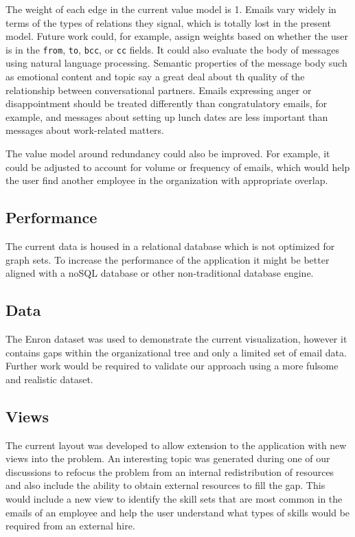 \documentclass[journal]{vgtc}                %
\begin{document}
The weight of each edge in the current value model is 1. Emails vary widely in terms of the types of relations they signal, which is totally lost in the present model. Future work could, for example, assign weights based on whether the user is in the \texttt{from}, \texttt{to}, \texttt{bcc}, or \texttt{cc} fields.  It could also evaluate the body of messages using natural language processing. Semantic properties of the message body such as emotional content and topic say a great deal about th quality of the relationship between conversational partners. Emails expressing anger or disappointment should be treated differently than congratulatory emails, for example, and messages about setting up lunch dates are less important than messages about work-related matters. 

The value model around redundancy could also be improved. For example, it could be adjusted to account for volume or frequency of emails, which would help the user find another employee in the organization with appropriate overlap.

\subsection{Performance}

The current data is housed in a relational database which is not optimized for graph sets.  To increase the performance of the application it might be better aligned with a noSQL database or other non-traditional database engine.

\subsection{Data}

The Enron dataset was used to demonstrate the current visualization, however it contains gaps within the organizational tree and only a limited set of email data.  Further work would be required to validate our approach using a more fulsome and realistic dataset.

\subsection{Views}

The current layout was developed to allow extension to the application with new views into the problem.  An interesting topic was generated during one of our discussions to refocus the problem from an internal redistribution of resources and also include the ability to obtain external resources to fill the gap.  This would include a new view to identify the skill sets that are most common in the emails of an employee and help the user understand what types of skills would be required from an external hire.
\end{document}
